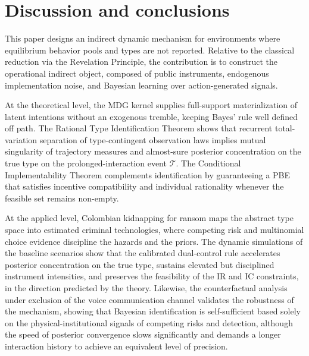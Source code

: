 \documentclass[review,authoryear,12pt]{elsarticle}
\theoremstyle{plain}
\theoremstyle{definition}
\newcommand{\1}{\mathbf{1}}
\begin{document}
\section{Discussion and conclusions}\label{sec:conclusiones}

This paper designs an indirect dynamic mechanism for environments where equilibrium behavior pools and types are not reported. Relative to the classical reduction via the Revelation Principle, the contribution is to construct the operational indirect object, composed of public instruments, endogenous implementation noise, and Bayesian learning over action-generated signals.

At the theoretical level, the MDG kernel supplies full-support materialization of latent intentions without an exogenous tremble, keeping Bayes' rule well defined off path. The Rational Type Identification Theorem shows that recurrent total-variation separation of type-contingent observation laws implies mutual singularity of trajectory measures and almost-sure posterior concentration on the true type on the prolonged-interaction event $\mathcal{T}$. The Conditional Implementability Theorem complements identification by guaranteeing a PBE that satisfies incentive compatibility and individual rationality whenever the feasible set remains non-empty.

At the applied level, Colombian kidnapping for ransom maps the abstract type space into estimated criminal technologies, where competing risk and multinomial choice evidence discipline the hazards and the priors. The dynamic simulations of the baseline scenarios show that the calibrated dual-control rule accelerates posterior concentration on the true type, sustains elevated but disciplined instrument intensities, and preserves the feasibility of the IR and IC constraints, in the direction predicted by the theory. Likewise, the counterfactual analysis under exclusion of the voice communication channel validates the robustness of the mechanism, showing that Bayesian identification is self-sufficient based solely on the physical-institutional signals of competing risks and detection, although the speed of posterior convergence slows significantly and demands a longer interaction history to achieve an equivalent level of precision.
\end{document}
